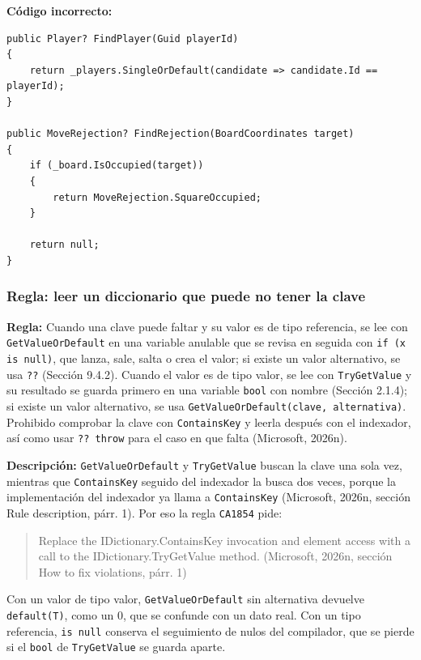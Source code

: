 \textbf{Código incorrecto:}
\begin{lstlisting}[style=csharpstyle]
public Player? FindPlayer(Guid playerId)
{
    return _players.SingleOrDefault(candidate => candidate.Id == playerId);
}

public MoveRejection? FindRejection(BoardCoordinates target)
{
    if (_board.IsOccupied(target))
    {
        return MoveRejection.SquareOccupied;
    }

    return null;
}
\end{lstlisting}

\subsubsection{Regla: leer un diccionario que puede no tener la clave}

\textbf{Regla:} Cuando una clave puede faltar y su valor es de tipo referencia, se lee con \texttt{GetValueOrDefault} en una variable anulable que se revisa en seguida con \texttt{if (x is null)}, que lanza, sale, salta o crea el valor; si existe un valor alternativo, se usa \texttt{??} (Sección 9.4.2). Cuando el valor es de tipo valor, se lee con \texttt{TryGetValue} y su resultado se guarda primero en una variable \texttt{bool} con nombre (Sección 2.1.4); si existe un valor alternativo, se usa \texttt{GetValueOrDefault(clave, alternativa)}. Prohibido comprobar la clave con \texttt{ContainsKey} y leerla después con el indexador, así como usar \texttt{?? throw} para el caso en que falta (Microsoft, 2026n).

\textbf{Descripción:} \texttt{GetValueOrDefault} y \texttt{TryGetValue} buscan la clave una sola vez, mientras que \texttt{ContainsKey} seguido del indexador la busca dos veces, porque la implementación del indexador ya llama a \texttt{ContainsKey} (Microsoft, 2026n, sección Rule description, párr. 1). Por eso la regla \texttt{CA1854} pide:
\begin{quote}
Replace the IDictionary.\allowbreak ContainsKey invocation and element access with a call to the IDictionary.\allowbreak TryGetValue method. (Microsoft, 2026n, sección How to fix violations, párr. 1)
\end{quote}
\noindent Con un valor de tipo valor, \texttt{GetValueOrDefault} sin alternativa devuelve \texttt{default(T)}, como un 0, que se confunde con un dato real. Con un tipo referencia, \texttt{is null} conserva el seguimiento de nulos del compilador, que se pierde si el \texttt{bool} de \texttt{TryGetValue} se guarda aparte.

